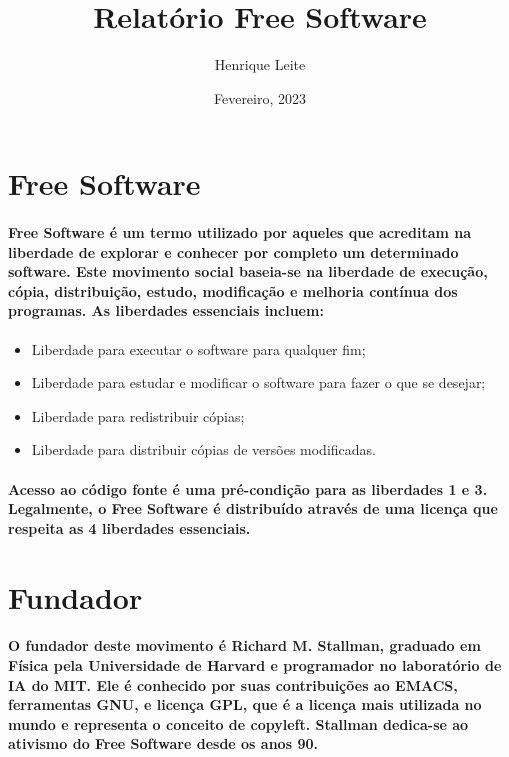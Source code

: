 \documentclass{article}
\title{Relatório Free Software}
\author{Henrique Leite}
\date{Fevereiro, 2023}
\begin{document}
\maketitle

\section{Free Software}
\paragraph{Free Software é um termo utilizado por aqueles que acreditam na liberdade de
explorar e conhecer por completo um determinado software. Este movimento social
baseia-se na liberdade de execução, cópia, distribuição, estudo, modificação e
melhoria contínua dos programas. As liberdades essenciais incluem:}

\begin{itemize}
    \item Liberdade para executar o software para qualquer fim;
    
    \item Liberdade para estudar e modificar o software para fazer o que se desejar;
    
    \item Liberdade para redistribuir cópias;

    \item Liberdade para distribuir cópias de versões modificadas.
\end{itemize}

\paragraph{Acesso ao código fonte é uma pré-condição para as liberdades 1 e 3. Legalmente, o Free Software é distribuído através de uma licença que respeita as 4 liberdades essenciais.}

\section{Fundador}
\paragraph{O fundador deste movimento é Richard M. Stallman, graduado em Física pela Universidade de Harvard e programador no laboratório de IA do MIT. Ele é conhecido por suas contribuições ao EMACS, ferramentas GNU, e licença GPL, que é a licença mais utilizada no mundo e representa o conceito de copyleft. Stallman dedica-se ao ativismo do Free Software desde os anos 90.}
\end{document}

